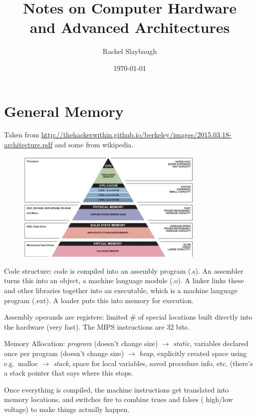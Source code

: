 \documentclass[12pt,twoside]{article}
\date{\today}
\title{Notes on Computer Hardware \\and Advanced Architectures}
\author{Rachel Slaybaugh}
\begin{document}
\maketitle

\section*{General Memory}
Taken from \href{http://thehackerwithin.github.io/berkeley/images/2015.03.18-architecture.pdf}{http://thehackerwithin.github.io/berkeley/images/2015.03.18-architecture.pdf} and some from wikipedia.

\begin{figure}[!ht]
\begin{center}
  \includegraphics[width=0.8\textwidth, height=0.45\textheight]{cpu-memory-hierarchy}
  \label{fig:cpu-memory}
\end{center}
\end{figure}

Code structure: code is compiled into an assembly program (.s). An assembler turns this into an object, a machine language module (.o). A linker links these and other libraries together into an executable, which is a machine language program (.ext). A loader puts this into memory for execution.

Assembly operands are registers: limited \# of special locations built directly into the hardware (very fast). The MIPS instructions are 32 bits. 

Memory Allocation: \textit{program} (doesn't change size) $\rightarrow$ \textit{static}, variables declared once per program (doesn't change size) $\rightarrow$ \textit{heap}, explicitly created space using e.g.\ malloc $\rightarrow$ \textit{stack}, space for local variables, saved procedure info, etc. (there's a stack pointer that says where this stops.

Once everything is compiled, the machine instructions get translated into memory locations, and switches fire to combine trues and falses (
high/low voltage) to make things actually happen.
\end{document}

